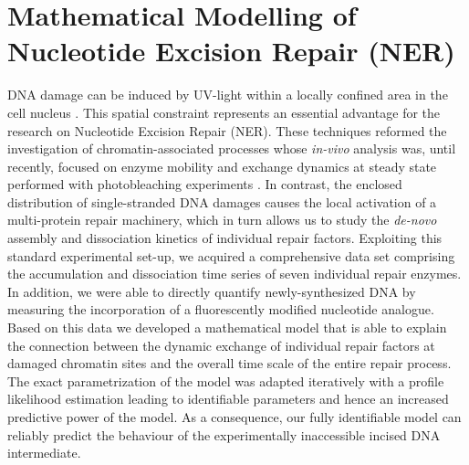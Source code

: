 \chapter{Mathematical Modelling of Nucleotide Excision Repair (NER)}
\pagestyle{plain}
%
DNA damage can be induced by UV-light within a locally confined area in the cell nucleus \cite{Mone2001}. This spatial constraint represents an essential advantage for the research on Nucleotide Excision Repair (NER). These techniques reformed the investigation of chromatin-associated processes whose \textit{in-vivo} analysis was, until recently, focused on enzyme mobility and exchange dynamics at steady state performed with photobleaching experiments \cite{Houtsmuller2001,Mone2004}. In contrast, the enclosed distribution of single-stranded DNA damages causes the local activation of a multi-protein repair machinery, which in turn allows us to study the \textit{de-novo} assembly and dissociation kinetics of individual repair factors. Exploiting this standard experimental set-up, we acquired a comprehensive data set comprising the accumulation and dissociation time series of seven individual repair enzymes. In addition, we were able to directly quantify newly-synthesized DNA by measuring the incorporation of a fluorescently modified nucleotide analogue.\\ 
Based on this data we developed a mathematical model that is able to explain the connection between the dynamic exchange of individual repair factors at damaged chromatin sites and the overall time scale of the entire repair process. The exact parametrization of the model was adapted iteratively with a profile likelihood estimation leading to identifiable parameters and hence an increased predictive power of the model. As a consequence, our fully identifiable model can reliably predict the behaviour of the experimentally inaccessible incised DNA intermediate.\\
   
